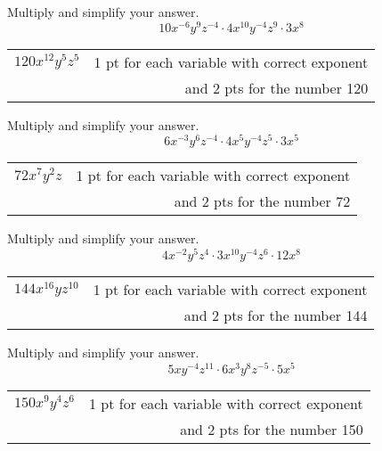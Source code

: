{
	Multiply and simplify your answer. 
	$$10x^{-6} y^9 z^{-4} \cdot 4x^{10} y^{-4} z^9\cdot 3x^8$$
}
{
	\begin{tabular}{l r}
	$120 x^{12} y^5z^5$ & 1 pt for each variable with correct exponent\\ & and 2 pts for the number 120
	\end{tabular}
}

{
	Multiply and simplify your answer. 
	$$6x^{-3} y^6 z^{-4}\cdot 4x^5 y^{-4} z^5\cdot3x^5$$
}
{
	\begin{tabular}{l r}
	$72x^7 y^2 z$ & 1 pt for each variable with correct exponent\\ & and 2 pts for the number 72
	\end{tabular}
}

{
	Multiply and simplify your answer. 
	$$4x^{-2} y^5 z^{4} \cdot 3x^{10} y^{-4} z^6\cdot 12x^8$$
}
{
	\begin{tabular}{l r}
	$144x^{16} y z^{10}$ & 1 pt for each variable with correct exponent\\ & and 2 pts for the number 144
	\end{tabular}
}

{
	Multiply and simplify your answer. 
	$$5xy^{-4} z^{11} \cdot 6x^{3} y^{8} z^{-5}\cdot 5x^5$$
}
{
	\begin{tabular}{l r}
	$150x^{9} y^{4}z^{6}$ & 1 pt for each variable with correct exponent\\ & and 2 pts for the number 150
	\end{tabular}
}
